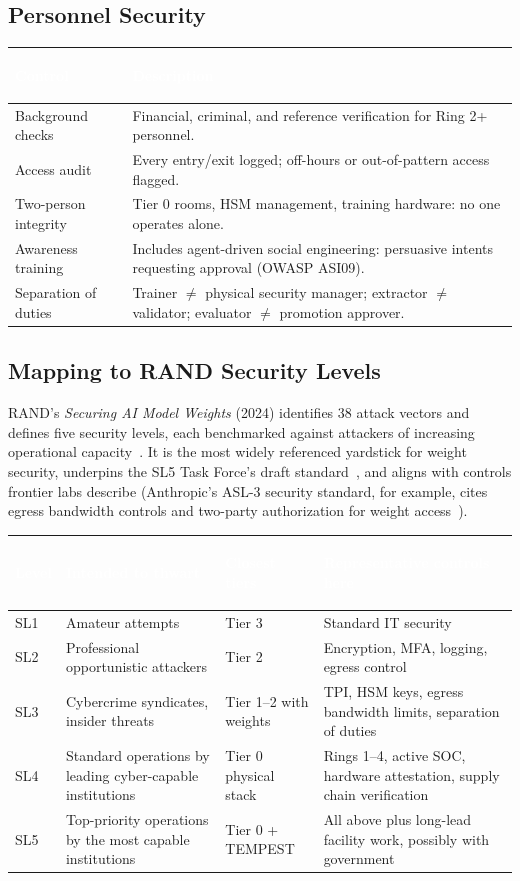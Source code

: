 \documentclass[11pt,letterpaper]{article}
\newcommand{\hrow}{\rowcolor{slategraphite}}
\newcommand{\hdr}[1]{\textcolor{white}{\bfseries\strut #1}}
\begin{document}
\subsection{Personnel Security}

\begin{longtable}{L{3.6cm} L{12.4cm}}
\hrow \hdr{Control} & \hdr{Description} \\
\endhead
Background checks & Financial, criminal, and reference verification for Ring 2+ personnel. \\
Access audit & Every entry/exit logged; off-hours or out-of-pattern access flagged. \\
Two-person integrity & Tier 0 rooms, HSM management, training hardware: no one operates alone. \\
Awareness training & Includes agent-driven social engineering: persuasive intents requesting approval (OWASP ASI09). \\
Separation of duties & Trainer $\neq$ physical security manager; extractor $\neq$ validator; evaluator $\neq$ promotion approver. \\*
\bottomrule
\end{longtable}

\subsection{Mapping to RAND Security Levels}
\label{sec:rand}

RAND's \emph{Securing AI Model Weights} (2024) identifies 38 attack vectors and defines five security levels, each benchmarked against attackers of increasing operational capacity~\cite{rand}. It is the most widely referenced yardstick for weight security, underpins the SL5 Task Force's draft standard~\cite{sl5}, and aligns with controls frontier labs describe (Anthropic's ASL-3 security standard, for example, cites egress bandwidth controls and two-party authorization for weight access~\cite{asl3}).

\begin{longtable}{L{1.1cm} L{4.4cm} L{3.2cm} L{6.6cm}}
\hrow \hdr{Level} & \hdr{Intended to thwart} & \hdr{Closest tiers} & \hdr{Representative controls here} \\
\endhead
SL1 & Amateur attempts & Tier 3 & Standard IT security \\
SL2 & Professional opportunistic attackers & Tier 2 & Encryption, MFA, logging, egress control \\
SL3 & Cybercrime syndicates, insider threats & Tier 1--2 with weights & TPI, HSM keys, egress bandwidth limits, separation of duties \\
SL4 & Standard operations by leading cyber-capable institutions & Tier 0 physical stack & Rings 1--4, active SOC, hardware attestation, supply chain verification \\
SL5 & Top-priority operations by the most capable institutions & Tier 0 + TEMPEST & All above plus long-lead facility work, possibly with government~\cite{sl5} \\*
\bottomrule
\end{longtable}
\end{document}
